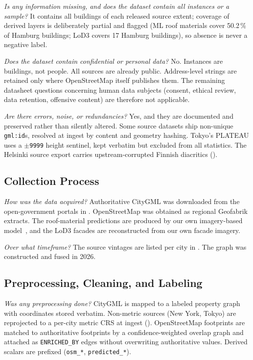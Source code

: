 \documentclass[sigconf,authordraft]{acmart}
\newcommand{\dsq}[1]{\par\smallskip\noindent\emph{#1}\space}
\begin{document}
\dsq{Is any information missing, and does the dataset contain all instances or a sample?} It contains all buildings of each released source extent; coverage of derived layers is deliberately partial and flagged (ML roof materials cover \num{50.2}\,\% of Hamburg buildings; LoD3 covers 17 Hamburg buildings), so absence is never a negative label.

\dsq{Does the dataset contain confidential or personal data?} No. Instances are buildings, not people. All sources are already public. Address-level strings are retained only where OpenStreetMap itself publishes them. The remaining datasheet questions concerning human data subjects (consent, ethical review, data retention, offensive content) are therefore not applicable.

\dsq{Are there errors, noise, or redundancies?} Yes, and they are documented and preserved rather than silently altered. Some source datasets ship non-unique \texttt{gml:id}s, resolved at ingest by content and geometry hashing. 
Tokyo's PLATEAU uses a $\pm$\texttt{9999} height sentinel, kept verbatim but excluded from all statistics. The Helsinki source export carries upstream-corrupted Finnish diacritics ().

\subsection{Collection Process}

\dsq{How was the data acquired?} Authoritative CityGML was downloaded from the open-government portals in . OpenStreetMap was obtained as regional Geofabrik extracts. The roof-material predictions are produced by our own imagery-based model~\cite{lukas_roofmaterials}, and the LoD3 facades are reconstructed from our own facade imagery.

\dsq{Over what timeframe?} The source vintages are listed per city in . The graph was constructed and fused in 2026.

\subsection{Preprocessing, Cleaning, and Labeling}

\dsq{Was any preprocessing done?} CityGML is mapped to a labeled property graph with coordinates stored verbatim. Non-metric sources (New York, Tokyo) are reprojected to a per-city metric CRS at ingest (). OpenStreetMap footprints are matched to authoritative footprints by a confidence-weighted overlap graph and attached as \texttt{ENRICHED\_BY} edges without overwriting authoritative values. Derived scalars are prefixed (\texttt{osm\_*}, \texttt{predicted\_*}).
\end{document}
